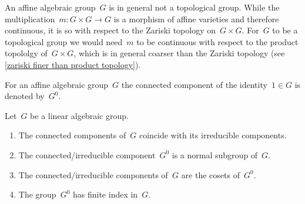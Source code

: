 \begin{warning}
  An affine algebraic group~$G$ is in general not a topological group.
  While the multiplication~$m \colon G \times G \to G$ is a morphism of affine varieties and therefore continuous, it is so with respect to the Zariski topology on~$G \times G$.
  For~$G$ to be a topological group we would need~$m$ to be continuous with respect to the product topololgy of~$G \times G$, which is in general coarser than the Zariski topology (see \cref{zariski finer than product topology}).
\end{warning}


\begin{definition}
  For an affine algebraic group~$G$ the connected component of the identity~$1 \in G$ is denoted by~$G^0$.
\end{definition}


\begin{proposition}
  Let~$G$ be a linear algebraic group.
  \begin{enumerate}
    \item
      The connected components of~$G$ coincide with its irreducible components.
    \item
      The connected/irreducible component~$G^0$ is a normal subgroup of~$G$.
    \item
      The connected/irreducible components of~$G$ are the cosets of~$G^0$.
    \item
      The group~$G^0$ has finite index in~$G$.
  \end{enumerate}
\end{proposition}


